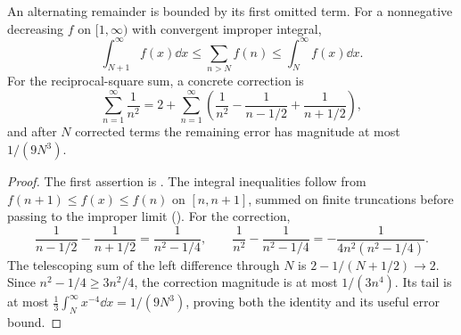 \begin{proposition}
An alternating remainder is bounded by its first omitted term. For a nonnegative decreasing $f$ on $[1,\infty)$ with convergent improper integral,
\[\int_{N+1}^\infty f(x)\dd x\leq\sum_{n>N}f(n)\leq\int_N^\infty f(x)\dd x.\]
For the reciprocal-square sum, a concrete correction is
\[\sum_{n=1}^\infty\frac1{n^2}=2+\sum_{n=1}^\infty\left(\frac1{n^2}-\frac1{n-1/2}+\frac1{n+1/2}\right),\]
and after $N$ corrected terms the remaining error has magnitude at most $1/(9N^3)$.
\end{proposition}
\begin{proof}
The first assertion is . The integral inequalities follow from $f(n+1)\leq f(x)\leq f(n)$ on $[n,n+1]$, summed on finite truncations before passing to the improper limit (). For the correction,
\[\frac1{n-1/2}-\frac1{n+1/2}=\frac1{n^2-1/4},\qquad
\frac1{n^2}-\frac1{n^2-1/4}=-\frac1{4n^2(n^2-1/4)}.\]
The telescoping sum of the left difference through $N$ is $2-1/(N+1/2)\to2$. Since $n^2-1/4\geq3n^2/4$, the correction magnitude is at most $1/(3n^4)$. Its tail is at most $\frac13\int_N^\infty x^{-4}\dd x=1/(9N^3)$, proving both the identity and its useful error bound.
\end{proof}
